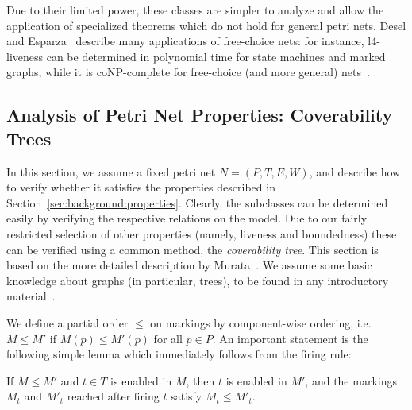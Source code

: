 Due to their limited power, these classes are simpler to analyze and allow the application of specialized theorems which do not hold for general petri nets. Desel and Esparza~\cite{desel2005free} describe many applications of free-choice nets: for instance, l4-liveness can be determined in polynomial time for state machines and marked graphs, while it is \textsf{coNP}-complete for free-choice (and more general) nets~\cite{desel2005free}.

\subsection{Analysis of Petri Net Properties: Coverability Trees}\label{sec:background:covtree}

In this section, we assume a fixed petri net $N=(P,T,E,W)$, and describe how to verify whether it satisfies the properties described in Section~\ref{sec:background:properties}. Clearly, the subclasses can be determined easily by verifying the respective relations on the model. Due to our fairly restricted selection of other properties (namely, liveness and boundedness) these can be verified using a common method, the \emph{coverability tree}. This section is based on the more detailed description by Murata~\cite{murata1989petri}. We assume some basic knowledge about graphs (in particular, trees), to be found in any introductory material~\cite{diestel1996graphentheorie}.

We define a partial order $\le$ on markings by component-wise ordering, i.e. $M\le M'$ if $M(p)\le M'(p)$ for all $p\in P$. An important statement is the following simple lemma which immediately follows from the firing rule:

\begin{lemma}\label{la:monotonicity}
	If $M\le M'$ and $t\in T$ is enabled in $M$, then $t$ is enabled in $M'$, and the markings $M_t$ and $M'_t$ reached after firing $t$ satisfy $M_t\le M'_t$.
\end{lemma}

